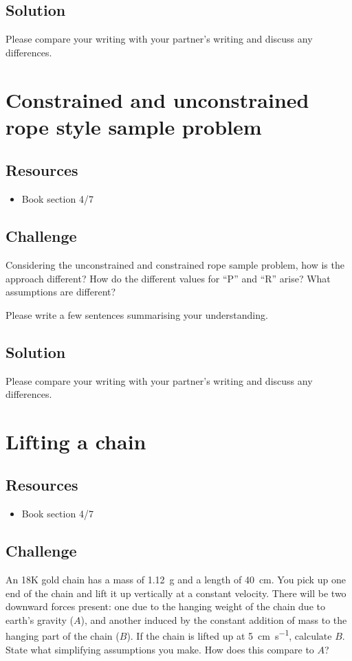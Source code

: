 \subsection*{Solution}
Please compare your writing with your partner's writing and discuss any differences.




\newpage
\section{Constrained and unconstrained rope style sample problem}

\subsection*{Resources}
\begin{itemize}
    \item Book section 4/7
\end{itemize}

\subsection*{Challenge}
Considering the unconstrained and constrained rope sample problem, how is the approach different? How do the different values for ``P'' and ``R'' arise? What assumptions are different?

Please write a few sentences summarising your understanding.

\subsection*{Solution}
Please compare your writing with your partner's writing and discuss any differences.




\newpage
\section{Lifting a chain}

\subsection*{Resources}
\begin{itemize}
    \item Book section 4/7
\end{itemize}

\subsection*{Challenge}
An 18K gold chain has a mass of \SI{1.12}{\gram} and a length of \SI{40}{\cm}. You pick up one end of the chain and lift it up vertically at a constant velocity. There will be two downward forces present: one due to the hanging weight of the chain due to earth's gravity ($A$), and another induced by the constant addition of mass to the hanging part of the chain ($B$). If the chain is lifted up at \SI{5}{\cm\per\s}, calculate $B$. State what simplifying assumptions you make. How does this compare to $A$?

